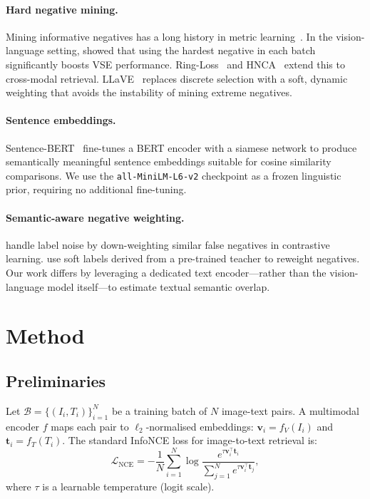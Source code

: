 \documentclass[10pt,twocolumn,letterpaper]{article}
\begin{document}
\paragraph{Hard negative mining.}
Mining informative negatives has a long history in metric learning~\cite{hardtriplet}.
In the vision-language setting, \citet{faghri2018vse++} showed that using the hardest negative in each batch significantly boosts VSE performance.
Ring-Loss~\cite{ring} and HNCA~\cite{hnca} extend this to cross-modal retrieval.
LLaVE~\cite{llave} replaces discrete selection with a soft, dynamic weighting that avoids the instability of mining extreme negatives.

\paragraph{Sentence embeddings.}
Sentence-BERT~\cite{sbert} fine-tunes a BERT encoder with a siamese network to produce semantically meaningful sentence embeddings suitable for cosine similarity comparisons.
We use the \texttt{all-MiniLM-L6-v2} checkpoint as a frozen linguistic prior, requiring no additional fine-tuning.

\paragraph{Semantic-aware negative weighting.}
\citet{andonian2022robust} handle label noise by down-weighting similar false negatives in contrastive learning.
\citet{zhang2022contrastive} use soft labels derived from a pre-trained teacher to reweight negatives.
Our work differs by leveraging a dedicated text encoder—rather than the vision-language model itself—to estimate textual semantic overlap.

\section{Method}

\subsection{Preliminaries}

Let $\mathcal{B} = \{(I_i, T_i)\}_{i=1}^{N}$ be a training batch of $N$ image-text pairs.
A multimodal encoder $f$ maps each pair to $\ell_2$-normalised embeddings:
$\mathbf{v}_i = f_V(I_i)$ and $\mathbf{t}_i = f_T(T_i)$.
The standard InfoNCE loss for image-to-text retrieval is:
\begin{equation}
  \mathcal{L}_\mathrm{NCE} = -\frac{1}{N}\sum_{i=1}^{N} \log \frac{e^{\tau \mathbf{v}_i^\top \mathbf{t}_i}}{\sum_{j=1}^{N} e^{\tau \mathbf{v}_i^\top \mathbf{t}_j}},
\end{equation}
where $\tau$ is a learnable temperature (logit scale).
\end{document}
